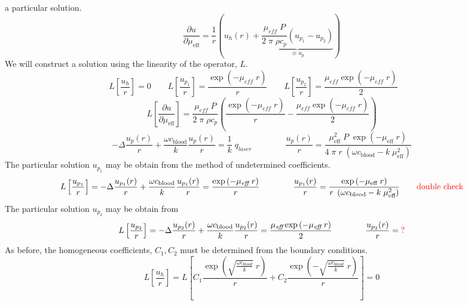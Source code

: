 \documentclass{article}         %
\theoremstyle{definition}
\theoremstyle{remark}
\begin{document}
a particular solution. 
\[
 \frac{\partial u}{\partial \mu_\text{eff}} = 
  \frac{1}{r}
   \left(
  u_h(r)+ 
 \underbrace{
\frac{\mu_\textit{eff} \;  P }{ 2 \; \pi \; \rho c_p}  
\left( u_{p_1} - u_{p_2} \right) 
 }_{\equiv u_p}
 \right)
\]
We will construct a solution using the linearity of the operator, $L$.
\[
  L \left[\frac{u_h}{r} \right] =  0 
  \qquad
  L \left[\frac{u_{p_1}}{r} \right] = 
    \frac{ \exp \left(-\mu_\textit{eff} \; r \right) }{  r}
  \qquad
  L \left[\frac{u_{p_2}}{r} \right] = 
    \frac{ \mu_\textit{eff} \exp \left(-\mu_\textit{eff} \; r \right) }{ 2 }
   \qquad
\]
\[
  L \left[ \frac{\partial u}{\partial \mu_\text{eff}}\right]= 
    \frac{\mu_\textit{eff} \;  P }{ 2 \; \pi \; \rho c_p}   
    \left(
    \frac{ \exp \left(-\mu_\textit{eff} \; r \right) }{  r}
   - 
    \frac{ \mu_\textit{eff} \exp \left(-\mu_\textit{eff} \; r \right) }{ 2 }
    \right)
\]
\[
 -\Delta  \frac{u_p(r)}{r} 
 + \frac{\omega c_\text{blood}}{k}  \frac{u_p(r)}{r} 
 = \frac{1}{k} \; q_{laser}
\qquad
\qquad
  \frac{u_p(r)}{r}  = 
    \frac{\mu_\text{eff}^2 \; P \; \exp \left(-\mu_\text{eff} \; r \right) }
         { 4 \; \pi \; r \; \left(\omega c_\text{blood}-k \; \mu_\text{eff}^2 \right)} 
\]
The particular solution $u_{p_1}$ may be obtain from the
method of undetermined coefficients.
\[
  L \left[\frac{u_{p_1}}{r} \right] = 
 -\Delta  \frac{u_{p_1}(r)}{r} 
 + \frac{\omega c_\text{blood}}{k}  \frac{u_{p_1}(r)}{r} 
 = 
    \frac{ \exp \left(-\mu_\textit{eff} \; r \right) }{  r}
\qquad
\qquad
  \frac{u_{p_1}(r)}{r}  = 
    \frac{\exp \left(-\mu_\text{eff} \; r \right) }
         { r \; \left(\omega c_\text{blood}-k \; \mu_\text{eff}^2 \right)} 
\qquad
\text{\color{red} double check}
\]
The particular solution $u_{p_2}$ may be obtain from 
\[
  L \left[\frac{u_{p_2}}{r} \right] = 
 -\Delta  \frac{u_{p_2}(r)}{r} 
 + \frac{\omega c_\text{blood}}{k}  \frac{u_{p_2}(r)}{r} 
 = 
    \frac{ \mu_\textit{eff} \exp \left(-\mu_\textit{eff} \; r \right) }{ 2 }
\qquad
\qquad
  \frac{u_{p_2}(r)}{r}  =  
\text{\color{red} ?}
\]
As before, the homogeneous coefficients, $C_1, C_2$ must be determined from the 
boundary conditions.
\[
  L \left[\frac{u_h}{r} \right] =   
 L\left[
    C_1 \frac{\exp\left( \sqrt{\frac{\omega c_\textit{blood}}{k}} \; r \right)}{r}  
  + 
    C_2 \frac{\exp\left(-\sqrt{\frac{\omega c_\textit{blood}}{k}} \; r \right)}{r}  
\right]
  = 0
\]
\end{document}
